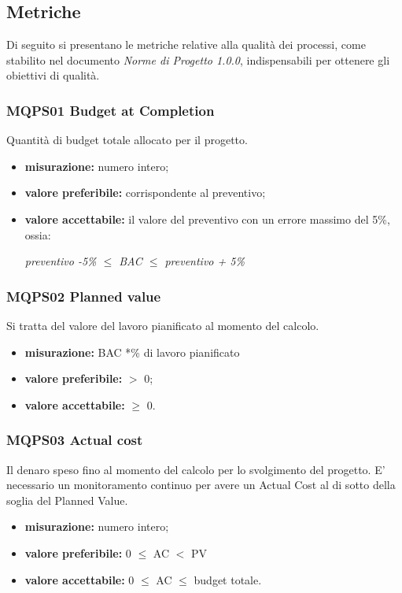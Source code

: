 \subsection{Metriche}\label{2.1.3}
Di seguito si presentano le metriche relative alla qualità dei processi, come stabilito nel
documento \textit{Norme di Progetto 1.0.0}, indispensabili per ottenere gli obiettivi di qualità.

\subsubsection{MQPS01 Budget at Completion}\label{2.1.3.1}
Quantità di budget totale allocato per il progetto.
\begin{itemize}
	\item \textbf{misurazione:} numero intero;
	\item \textbf{valore preferibile:} corrispondente al preventivo;
	\item \textbf{valore accettabile:} il valore del preventivo con un errore massimo del 5\%, ossia:
	\begin{center}
		\textit{preventivo -5\% $\leq$ BAC $\leq$ preventivo + 5\%}
	\end{center}
\end{itemize}

\subsubsection{MQPS02 Planned value}\label{2.1.3.2}
Si tratta del valore del lavoro pianificato al momento del calcolo.
\begin{itemize}
	\item \textbf{misurazione:} BAC *\% di lavoro pianificato
	\item \textbf{valore preferibile:} $>$ 0;
	\item \textbf{valore accettabile:} $\geq$ 0.
\end{itemize}

\subsubsection{MQPS03 Actual cost}\label{2.1.3.3}
Il denaro speso fino al momento del calcolo per lo svolgimento del progetto.
E’ necessario un monitoramento continuo per avere un Actual Cost al di sotto della soglia del Planned Value.
\begin{itemize}
	\item \textbf{misurazione:} numero intero;
	\item \textbf{valore preferibile:} 0 $\leq$ AC $<$ PV
	\item \textbf{valore accettabile:}  0 $\leq$ AC $\leq$  budget totale.
\end{itemize}


